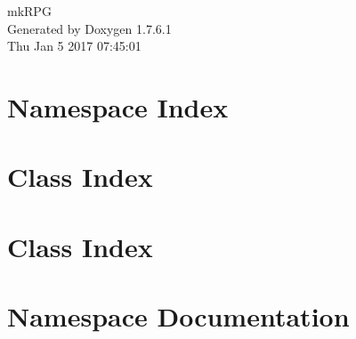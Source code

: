 \documentclass[a4paper]{book}
\begin{document}
\hypersetup{pageanchor=false,citecolor=blue}
\begin{titlepage}
\vspace*{7cm}
\begin{center}
{\Large mk\-R\-P\-G }\\
\vspace*{1cm}
{\large \-Generated by Doxygen 1.7.6.1}\\
\vspace*{0.5cm}
{\small Thu Jan 5 2017 07:45:01}\\
\end{center}
\end{titlepage}
\clearemptydoublepage
{}
\tableofcontents
\clearemptydoublepage
{}
\hypersetup{pageanchor=true,citecolor=blue}
\chapter{\-Namespace \-Index}

\chapter{\-Class \-Index}

\chapter{\-Class \-Index}

\chapter{\-Namespace \-Documentation}

























\end{document}
